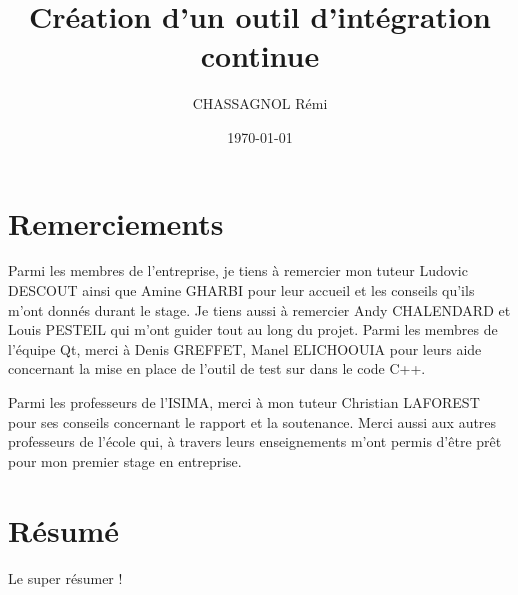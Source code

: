 \documentclass[a4paper]{article}
\title{Création d'un outil d'intégration continue}
\author{CHASSAGNOL Rémi}
\date{\today}
\begin{document}

\clearpage{}

\thispagestyle{empty}
\tableofcontents
\clearpage{}

\section*{Remerciements}
\thispagestyle{empty}

\doublespacing


Parmi les membres de l'entreprise, je tiens à remercier mon tuteur Ludovic
DESCOUT ainsi que Amine GHARBI pour leur accueil et les conseils qu'ils m'ont
donnés durant le stage. Je tiens aussi à remercier Andy CHALENDARD et Louis
PESTEIL qui m'ont guider tout au long du projet. Parmi les membres de l'équipe
Qt, merci à Denis GREFFET, Manel ELICHOOUIA pour leurs aide concernant la mise
en place de l'outil de test sur dans le code C++.

Parmi les professeurs de l'ISIMA, merci à mon tuteur Christian LAFOREST pour ses
conseils concernant le rapport et la soutenance. Merci aussi aux autres
professeurs de l'école qui, à travers leurs enseignements m'ont permis d'être
prêt pour mon premier stage en entreprise.

\onehalfspacing

\clearpage{}

\listoffigures
\clearpage{}

\section*{Résumé}

Le super résumer !
\\~\\
\end{document}
